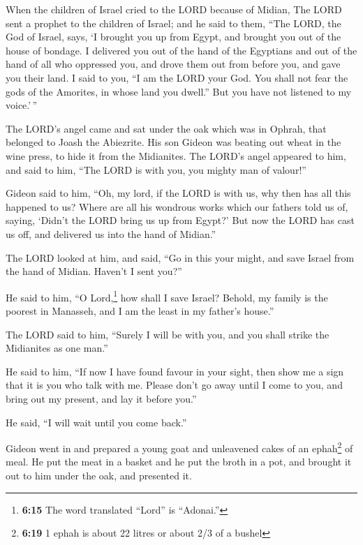  When the children of Israel cried to the LORD because of
Midian,  The LORD sent a prophet to the children of
Israel; and he said to them, ``The LORD, the God of Israel, says, `I
brought you up from Egypt, and brought you out of the house of bondage.
 I delivered you out of the hand of the Egyptians and out
of the hand of all who oppressed you, and drove them out from before
you, and gave you their land.  I said to you, ``I am the
LORD your God. You shall not fear the gods of the Amorites, in whose
land you dwell.'' But you have not listened to my voice.'\,''

 The LORD's angel came and sat under the oak which was in
Ophrah, that belonged to Joash the Abiezrite. His son Gideon was beating
out wheat in the wine press, to hide it from the Midianites.
 The LORD's angel appeared to him, and said to him, ``The
LORD is with you, you mighty man of valour!''

 Gideon said to him, ``Oh, my lord, if the LORD is with
us, why then has all this happened to us? Where are all his wondrous
works which our fathers told us of, saying, `Didn't the LORD bring us up
from Egypt?' But now the LORD has cast us off, and delivered us into the
hand of Midian.''

 The LORD looked at him, and said, ``Go in this your
might, and save Israel from the hand of Midian. Haven't I sent you?''

 He said to him, ``O Lord,\footnote{\textbf{6:15} The
  word translated ``Lord'' is ``Adonai.''} how shall I save Israel?
Behold, my family is the poorest in Manasseh, and I am the least in my
father's house.''

 The LORD said to him, ``Surely I will be with you, and
you shall strike the Midianites as one man.''

 He said to him, ``If now I have found favour in your
sight, then show me a sign that it is you who talk with me.
 Please don't go away until I come to you, and bring out
my present, and lay it before you.''

He said, ``I will wait until you come back.''

 Gideon went in and prepared a young goat and unleavened
cakes of an ephah\footnote{\textbf{6:19} 1 ephah is about 22 litres or
  about 2/3 of a bushel} of meal. He put the meat in a basket and he put
the broth in a pot, and brought it out to him under the oak, and
presented it.

